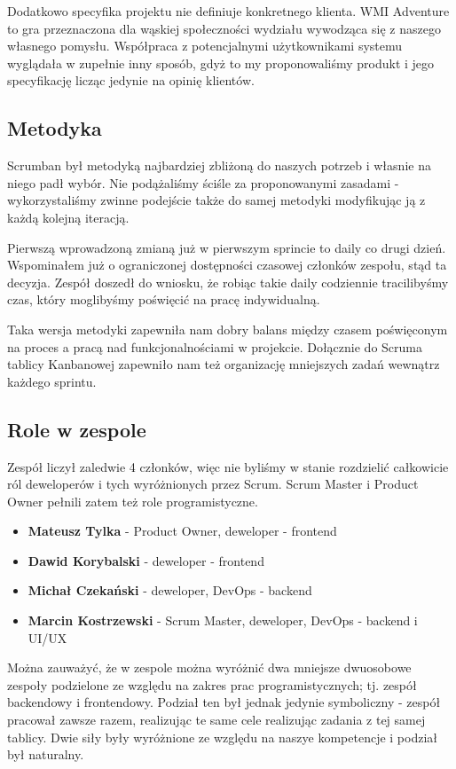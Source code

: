 \documentclass{article}
\begin{document}
Dodatkowo specyfika projektu nie definiuje konkretnego klienta. WMI Adventure to gra przeznaczona dla wąskiej społeczności wydziału wywodząca się z naszego własnego pomysłu. Współpraca z potencjalnymi użytkownikami systemu wyglądała w zupełnie inny sposób, gdyż to my proponowaliśmy produkt i jego specyfikację licząc jedynie na opinię klientów.

\subsection{Metodyka}
Scrumban był metodyką najbardziej zbliżoną do naszych potrzeb i własnie na niego padł wybór. Nie podążaliśmy ściśle za proponowanymi zasadami - wykorzystaliśmy zwinne podejście także do samej metodyki modyfikując ją z każdą kolejną iteracją.

Pierwszą wprowadzoną zmianą już w pierwszym sprincie to daily co drugi dzień. Wspominałem już o ograniczonej dostępności czasowej członków zespołu, stąd ta decyzja. Zespół doszedł do wniosku, że robiąc takie daily codziennie tracilibyśmy czas, który moglibyśmy poświęcić na pracę indywidualną.

Taka wersja metodyki zapewniła nam dobry balans między czasem poświęconym na proces a pracą nad funkcjonalnościami w projekcie. Dołącznie do Scruma tablicy Kanbanowej zapewniło nam też organizację mniejszych zadań wewnątrz każdego sprintu.

\subsection{Role w zespole}
Zespół liczył zaledwie 4 członków, więc nie byliśmy w stanie rozdzielić całkowicie ról deweloperów i tych wyróżnionych przez Scrum. Scrum Master i Product Owner pełnili zatem też role programistyczne.

\begin{itemize}
    \item \textbf{Mateusz Tylka} - Product Owner, deweloper - frontend
    \item \textbf{Dawid Korybalski} - deweloper - frontend
    \item \textbf{Michał Czekański} - deweloper, DevOps - backend
    \item \textbf{Marcin Kostrzewski} - Scrum Master, deweloper, DevOps - backend i UI/UX
\end{itemize}

Można zauważyć, że w zespole można wyróżnić dwa mniejsze dwuosobowe zespoły podzielone ze względu na zakres prac programistycznych; tj. zespół backendowy i frontendowy. Podział ten był jednak jedynie symboliczny - zespół pracował zawsze razem, realizując te same cele realizując zadania z tej samej tablicy. Dwie siły były wyróżnione ze względu na naszye kompetencje i podział był naturalny.
\end{document}
